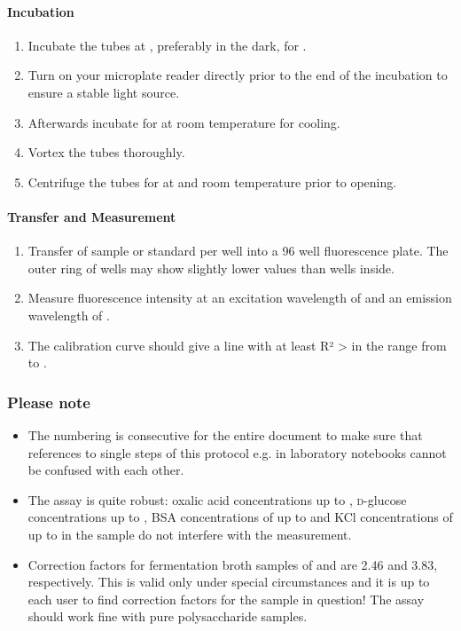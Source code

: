 \paragraph{Incubation}
\begin{enumerate}
	\setcounter{enumi}{\value{sirofluor-protocol}}
	\item Incubate the tubes at , preferably in the dark, for .
	\item Turn on your microplate reader directly prior to the end of the incubation to ensure a stable light source.
	\item Afterwards incubate for  at room temperature for cooling.
	\item Vortex the tubes thoroughly.
	\item Centrifuge the tubes for  at  and room temperature prior to opening.
	\setcounter{sirofluor-protocol}{\value{enumi}}
\end{enumerate}

\paragraph{Transfer and Measurement}
\begin{enumerate}
	\setcounter{enumi}{\value{sirofluor-protocol}}
	\item Transfer  of sample or standard per well into a 96 well fluorescence plate. The outer ring of wells may show slightly lower values than wells inside.
	\item Measure fluorescence intensity at an excitation wavelength of  and an emission wavelength of .
	\item The calibration curve should give a line with at least R² >  in the range from  to .
	\setcounter{sirofluor-protocol}{\value{enumi}}
\end{enumerate}

\subsubsection{Please note}
\begin{itemize}
	\item The numbering is consecutive for the entire document to make sure that references to single steps of this protocol e.g. in laboratory notebooks cannot be confused with each other.
	\item The assay is quite robust: oxalic acid concentrations up to , \textsc{d}-glucose concentrations up to , BSA concentrations of up to  and KCl concentrations of up to  in the sample do not interfere with the measurement.
	\item Correction factors for fermentation broth samples of \rolf{} and \comm{} are 2.46 and 3.83, respectively. This is valid only under special circumstances and it is up to each user to find correction factors for the sample in question! The assay should work fine with pure polysaccharide samples.
\end{itemize}

